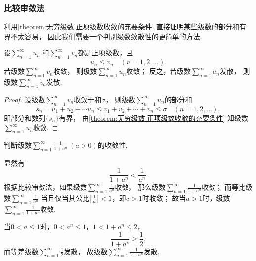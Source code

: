 \subsubsection{比较审敛法}
利用\cref{theorem:无穷级数.正项级数收敛的充要条件} 直接证明某些级数的部分和有界不太容易，
因此我们需要一个判别级数敛散性的更简单的方法.

\begin{theorem}[比较审敛法]\label{theorem:无穷级数.正项级数的比较审敛法}
设\(\sum\limits_{n=1}^\infty u_n\)
和\(\sum\limits_{n=1}^\infty v_n\)都是正项级数，且\[
	u_n \leq v_n
	\quad(n=1,2,\dotsc).
\]
若级数\(\sum\limits_{n=1}^\infty v_n\)收敛，
则级数\(\sum\limits_{n=1}^\infty u_n\)收敛；
反之，若级数\(\sum\limits_{n=1}^\infty u_n\)发散，
则级数\(\sum\limits_{n=1}^\infty v_n\)发散.
\begin{proof}
设级数\(\sum\limits_{n=1}^\infty v_n\)收敛于和\(\sigma\)，
则级数\(\sum\limits_{n=1}^\infty u_n\)的部分和\[
	s_n = u_1 + u_2 + \dotsb u_n
	\leq
	v_1 + v_2 + \dotsb + v_n \leq \sigma
	\quad(n=1,2,\dotsc),
\]
即部分和数列\(\{s_n\}\)有界，
由\cref{theorem:无穷级数.正项级数收敛的充要条件} 知级数\(\sum\limits_{n=1}^\infty u_n\)收敛.
\end{proof}
\end{theorem}

\begin{example}
判断级数\(\sum\limits_{n=1}^\infty \frac{1}{1+a^n}\ (a>0)\)的收敛性.
\begin{solution}
显然有\[
	\frac{1}{1+a^n} < \frac{1}{a^n}.
\]
根据比较审敛法，如果级数\(\sum\limits_{n=1}^\infty \frac{1}{a^n}\)收敛，
那么级数\(\sum\limits_{n=1}^\infty \frac{1}{1+a^n}\)收敛；
而等比级数\(\sum\limits_{n=1}^\infty \frac{1}{a^n}\)
当且仅当其公比\(\abs{\frac{1}{a}} < 1\)，即\(a > 1\)时收敛；
故当\(a > 1\)时，级数\(\sum\limits_{n=1}^\infty \frac{1}{1+a^n}\)收敛.

当\(0 < a \leq 1\)时，\(0 < a^n \leq 1\)，\(1 < 1 + a^n \leq 2\)，\[
	\frac{1}{1+a^n} \geq \frac{1}{2},
\]
而等差级数\(\sum\limits_{n=1}^\infty \frac{1}{2}\)发散，
故级数\(\sum\limits_{n=1}^\infty \frac{1}{1+a^n}\)发散.
\end{solution}
\end{example}

